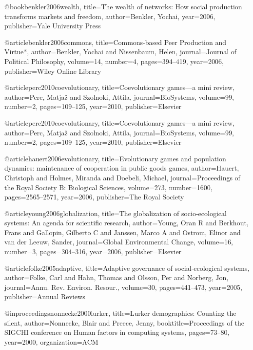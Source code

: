 @book{benkler2006wealth,
  title={The wealth of networks: How social production transforms markets and freedom},
  author={Benkler, Yochai},
  year={2006},
  publisher={Yale University Press}
}

@article{benkler2006commons,
  title={Commons-based Peer Production and Virtue*},
  author={Benkler, Yochai and Nissenbaum, Helen},
  journal={Journal of Political Philosophy},
  volume={14},
  number={4},
  pages={394--419},
  year={2006},
  publisher={Wiley Online Library}
}



@article{perc2010coevolutionary,
  title={Coevolutionary games—a mini review},
  author={Perc, Matja{\v{z}} and Szolnoki, Attila},
  journal={BioSystems},
  volume={99},
  number={2},
  pages={109--125},
  year={2010},
  publisher={Elsevier}
}

@article{perc2010coevolutionary,
  title={Coevolutionary games—a mini review},
  author={Perc, Matja{\v{z}} and Szolnoki, Attila},
  journal={BioSystems},
  volume={99},
  number={2},
  pages={109--125},
  year={2010},
  publisher={Elsevier}
}

@article{hauert2006evolutionary,
  title={Evolutionary games and population dynamics: maintenance of cooperation in public goods games},
  author={Hauert, Christoph and Holmes, Miranda and Doebeli, Michael},
  journal={Proceedings of the Royal Society B: Biological Sciences},
  volume={273},
  number={1600},
  pages={2565--2571},
  year={2006},
  publisher={The Royal Society}
}

@article{young2006globalization,
  title={The globalization of socio-ecological systems: An agenda for scientific research},
  author={Young, Oran R and Berkhout, Frans and Gallopin, Gilberto C and Janssen, Marco A and Ostrom, Elinor and van der Leeuw, Sander},
  journal={Global Environmental Change},
  volume={16},
  number={3},
  pages={304--316},
  year={2006},
  publisher={Elsevier}
}

@article{folke2005adaptive,
  title={Adaptive governance of social-ecological systems},
  author={Folke, Carl and Hahn, Thomas and Olsson, Per and Norberg, Jon},
  journal={Annu. Rev. Environ. Resour.},
  volume={30},
  pages={441--473},
  year={2005},
  publisher={Annual Reviews}
}

@inproceedings{nonnecke2000lurker,
  title={Lurker demographics: Counting the silent},
  author={Nonnecke, Blair and Preece, Jenny},
  booktitle={Proceedings of the SIGCHI conference on Human factors in computing systems},
  pages={73--80},
  year={2000},
  organization={ACM}
}

